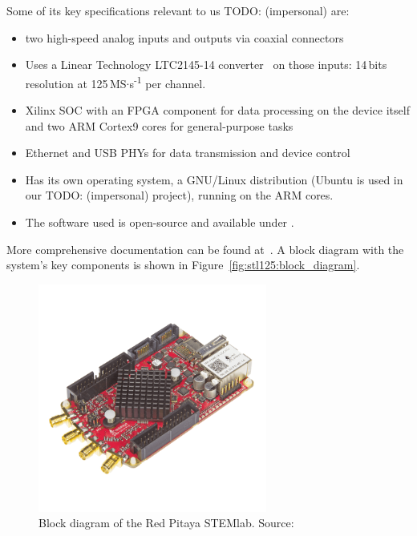 Some of its key specifications relevant to us TODO: (impersonal) are:
\begin{itemize}\tightlist
    \item
        two high-speed analog inputs and outputs via coaxial connectors
    \item
        Uses  a  Linear Technology  LTC2145-14  converter~\cite{lt:ltc2145-14}
        on      those      inputs:      \num{14}\,bits      resolution      at
        \num{125}\,MS$\cdot$s\textsuperscript{-1} per channel.
    \item
        Xilinx SOC  with an FPGA component  for data processing on  the device
        itself and two ARM Cortex9 cores for general-purpose tasks
    \item
        Ethernet and USB PHYs for data transmission and device control
    \item
        Has its own operating system, a GNU/Linux distribution (Ubuntu is used
        in our TODO: (impersonal) project), running on the ARM cores.
    \item
        The software used is open-source and available under \cite{pita:github}.
\end{itemize}
More  comprehensive documentation  can be  found at~\cite{pita:readthedocs}. A
block   diagram   with    the   system's   key   components    is   shown   in
Figure~\ref{fig:stl125:block_diagram}.

\begin{figure}
    \centering
    \includegraphics[width=0.67\textwidth]{images/stl125/stemlab125-14-photo.png}
    \caption{Block diagram of the Red Pitaya STEMlab. Source:~\cite{pita:elektor:starterkit}}
    \label{fig:stl125:photo}
\end{figure}

